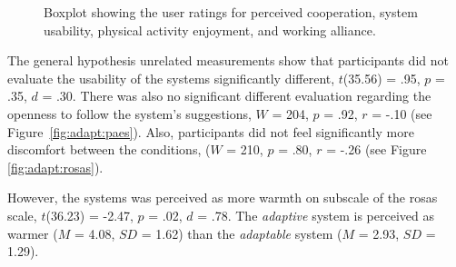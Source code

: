 \documentclass[twocolumn]{svjour3}          %
\begin{document}
\begin{figure}[bt!]
 \caption{\label{fig:adapt:paes} Boxplot showing the user ratings for perceived cooperation, system usability, physical activity enjoyment, and working alliance.}\label{fig:unnamed-chunk-4}
\end{figure}

% 
The general hypothesis unrelated measurements show that participants did not evaluate the usability of the systems significantly different, \(t\)(35.56) = .95, \(p\) = .35, \(d\) = .30. There was also no significant different evaluation regarding the openness to follow the system's suggestions, \(W\) = 204, \(p\) = .92, \(r\) = -.10 (see Figure~\ref{fig:adapt:paes}). Also, participants did not feel significantly more discomfort between the conditions, (\(W\) = 210, \(p\) = .80, \(r\) = -.26 (see Figure \ref{fig:adapt:rosas}).

However, the systems was perceived as more warmth on subscale of the \gls{rosas} scale, \(t\)(36.23) = -2.47, \(p\) = .02, \(d\) = .78. The \textit{adaptive} system is perceived as warmer (\(M\) = 4.08, \(SD\) = 1.62) than the \textit{adaptable} system (\(M\) = 2.93, \(SD\) = 1.29).


% 
\end{document}
